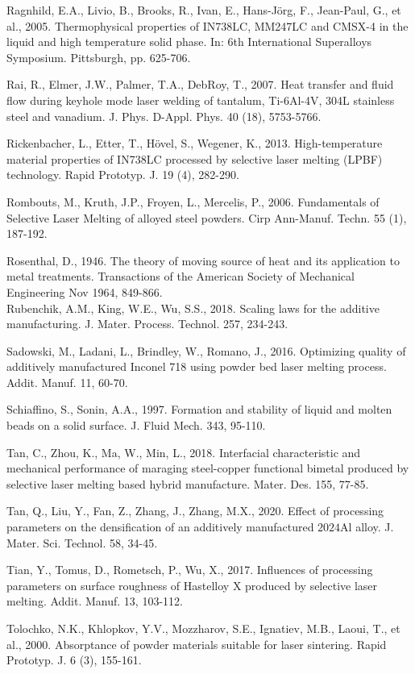 \documentclass[10pt]{article}
\begin{document}
Ragnhild, E.A., Livio, B., Brooks, R., Ivan, E., Hans-Jörg, F., Jean-Paul, G., et al., 2005. Thermophysical properties of IN738LC, MM247LC and CMSX-4 in the liquid and high temperature solid phase. In: 6th International Superalloys Symposium. Pittsburgh, pp. 625-706.

Rai, R., Elmer, J.W., Palmer, T.A., DebRoy, T., 2007. Heat transfer and fluid flow during keyhole mode laser welding of tantalum, Ti-6Al-4V, 304L stainless steel and vanadium. J. Phys. D-Appl. Phys. 40 (18), 5753-5766.

Rickenbacher, L., Etter, T., Hövel, S., Wegener, K., 2013. High-temperature material properties of IN738LC processed by selective laser melting (LPBF) technology. Rapid Prototyp. J. 19 (4), 282-290.

Rombouts, M., Kruth, J.P., Froyen, L., Mercelis, P., 2006. Fundamentals of Selective Laser Melting of alloyed steel powders. Cirp Ann-Manuf. Techn. 55 (1), 187-192.

Rosenthal, D., 1946. The theory of moving source of heat and its application to metal treatments. Transactions of the American Society of Mechanical Engineering Nov 1964, 849-866.\\
Rubenchik, A.M., King, W.E., Wu, S.S., 2018. Scaling laws for the additive manufacturing. J. Mater. Process. Technol. 257, 234-243.

Sadowski, M., Ladani, L., Brindley, W., Romano, J., 2016. Optimizing quality of additively manufactured Inconel 718 using powder bed laser melting process. Addit. Manuf. 11, 60-70.

Schiaffino, S., Sonin, A.A., 1997. Formation and stability of liquid and molten beads on a solid surface. J. Fluid Mech. 343, 95-110.

Tan, C., Zhou, K., Ma, W., Min, L., 2018. Interfacial characteristic and mechanical performance of maraging steel-copper functional bimetal produced by selective laser melting based hybrid manufacture. Mater. Des. 155, 77-85.

Tan, Q., Liu, Y., Fan, Z., Zhang, J., Zhang, M.X., 2020. Effect of processing parameters on the densification of an additively manufactured $2024 \mathrm{Al}$ alloy. J. Mater. Sci. Technol. 58, 34-45.

Tian, Y., Tomus, D., Rometsch, P., Wu, X., 2017. Influences of processing parameters on surface roughness of Hastelloy X produced by selective laser melting. Addit. Manuf. 13, 103-112.

Tolochko, N.K., Khlopkov, Y.V., Mozzharov, S.E., Ignatiev, M.B., Laoui, T., et al., 2000. Absorptance of powder materials suitable for laser sintering. Rapid Prototyp. J. 6 (3), 155-161.
\end{document}
